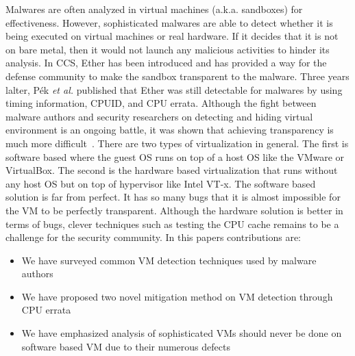 Malwares are often analyzed in virtual machines (a.k.a. sandboxes) for effectiveness. However, sophisticated malwares are able to detect whether it is being executed on virtual machines or real hardware. If it decides that it is not on bare metal, then it would not launch any malicious activities to hinder its analysis. In CCS, Ether \cite{ether} has been introduced and has provided a way for the defense community to make the sandbox transparent to the malware. Three years lalter, P{\'e}k \textit{et al.}\cite{nether} published that Ether\cite{ether} was still detectable for malwares by using timing information, CPUID, and CPU errata. Although the fight between malware authors and security researchers on detecting and hiding virtual environment is an ongoing battle, it was shown that achieving transparency is much more difficult~\cite{garfinkel2007}.
There are two types of virtualization in general. The first is software based where the guest OS runs on top of a host OS like the VMware or VirtualBox. The second is the hardware based virtualization that runs without any host OS but on top of hypervisor like Intel VT-x. The software based solution is far from perfect. It has so many bugs that it is almost impossible for the VM to be perfectly transparent. Although the hardware solution is better in terms of bugs, clever techniques such as testing the CPU cache remains to be a challenge for the security community.
In this paper\textquotesingle s contributions are:

\begin{itemize}
\item We have surveyed common VM detection techniques used by malware authors
\item We have proposed two novel mitigation method on VM detection through CPU errata
\item We have emphasized analysis of sophisticated VMs should never be done on software based VM due to their numerous defects 
\end{itemize}

